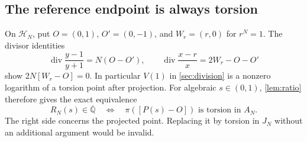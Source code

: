 \documentclass[11pt,a4paper]{article}
\numberwithin{equation}{section}
\theoremstyle{definition}
\theoremstyle{remark}
\newcommand{\Qb}{\overline{\mathbb Q}}
\newcommand{\divisor}{\operatorname{div}}
\begin{document}
\subsection{The reference endpoint is always torsion}
On $\mathcal H_N$, put $O=(0,1)$, $O'=(0,-1)$, and $W_r=(r,0)$ for
$r^N=1$. The divisor identities
\begin{equation}\label{eq:branch-torsion}
 \divisor\frac{y-1}{y+1}=N(O-O'),\qquad
 \divisor\frac{x-r}{x}=2W_r-O-O'
\end{equation}
show $2N[W_r-O]=0$. In particular $V(1)$ in \cref{sec:division} is a
nonzero logarithm of a torsion point after projection. For algebraic
$s\in(0,1)$, \cref{lem:ratio} therefore gives the exact equivalence
\begin{equation}\label{eq:ratio-torsion}
 R_N(s)\in\Qb
 \quad\Longleftrightarrow\quad
 \pi([P(s)-O])\text{ is torsion in }A_N.
\end{equation}
The right side concerns the projected point. Replacing it by torsion in
$J_N$ without an additional argument would be invalid.
\end{document}
